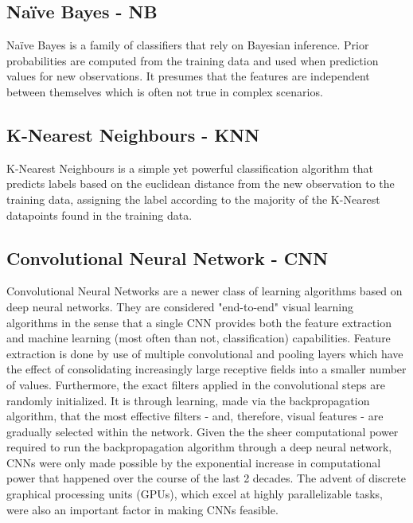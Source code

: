 \documentclass[11pt]{article}
\begin{document}
    \subsection{Naïve Bayes - NB}
        Naïve Bayes is a family of classifiers that rely on Bayesian inference. Prior probabilities are computed from the training data and used when prediction values for new observations. It presumes that the features are independent between themselves which is often not true in complex scenarios.
    \subsection{K-Nearest Neighbours - KNN}
        K-Nearest Neighbours is a simple yet powerful classification algorithm that predicts labels based on the euclidean distance from the new observation to the training data, assigning the label according to the majority of the K-Nearest datapoints found in the training data.

    \subsection{Convolutional Neural Network - CNN}\label{CNN}
        Convolutional Neural Networks are a newer class of learning algorithms based on deep neural networks. They are considered "end-to-end" visual learning algorithms in the sense that a single CNN provides both the feature extraction and machine learning (most often than not, classification) capabilities. Feature extraction is done by use of multiple convolutional and pooling layers which have the effect of consolidating increasingly large receptive fields into a smaller number of values. Furthermore, the exact filters applied in the convolutional steps are randomly initialized. It is through learning, made via the backpropagation algorithm, that the most effective filters - and, therefore, visual features - are gradually selected within the network. Given the the sheer computational power required to run the backpropagation algorithm through a deep neural network, CNNs were only made possible by the exponential increase in computational power that happened over the course of the last 2 decades. The advent of discrete graphical processing units (GPUs), which excel at highly parallelizable tasks, were also an important factor in making CNNs feasible.
\end{document}
